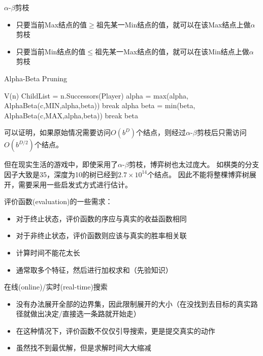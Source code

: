 $\alpha$-$\beta$剪枝
\begin{itemize}
	\item 只要当前Max结点的值$\geq$祖先某一Min结点的值，就可以在该Max结点上做$\alpha$剪枝
	\item 只要当前Min结点的值$\leq$祖先某一Max结点的值，就可以在该Min结点上做$\alpha$剪枝
\end{itemize}
\begin{algorithm}
\caption{Alpha-Beta Pruning}
\begin{algorithmic}[1]
\State \Return V(n)
\EndIf
\State ChildList = n.Successors(Player)
\State alpha = max(alpha, AlphaBeta(c,MIN,alpha,beta))
\State break
\EndIf
\EndFor
\State \Return alpha
\Else{}
\State beta = min(beta, AlphaBeta(c,MAX,alpha,beta))
\State break
\EndIf
\EndFor
\State \Return beta
\EndIf
\EndProcedure{}
\end{algorithmic}
\end{algorithm}
可以证明，如果原始情况需要访问$O(b^D)$个结点，则经过$\alpha$-$\beta$剪枝后只需访问$O(b^{D/2})$个结点。

但在现实生活的游戏中，即使采用了$\alpha$-$\beta$剪枝，博弈树也太过庞大。
如棋类的分支因子大致是35，深度为10的树已经到$2.7\times 10^{14}$个结点。
因此不能将整棵博弈树展开，需要采用一些启发式方式进行估计。

评价函数(evaluation)的一些需求：
\begin{itemize}
	\item 对于终止状态，评价函数的序应与真实的收益函数相同
	\item 对于非终止状态，评价函数则应该与真实的胜率相关联
	\item 计算时间不能花太长
	\item 通常取多个特征，然后进行加权求和（先验知识）
\end{itemize}

在线(online)/实时(real-time)搜索
\begin{itemize}
	\item 没有办法展开全部的边界集，因此限制展开的大小（在没找到去目标的真实路径就做出决定/直接选一条路就开始走）
	\item 在这种情况下，评价函数不仅仅引导搜索，更是提交真实的动作
	\item 虽然找不到最优解，但是求解时间大大缩减
\end{itemize}